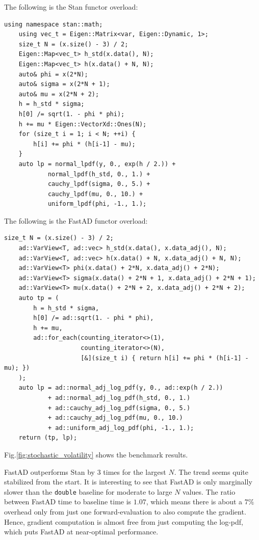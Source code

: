 The following is the Stan functor overload:
\begin{lstlisting}[style=customcpp]
    using namespace stan::math;
    using vec_t = Eigen::Matrix<var, Eigen::Dynamic, 1>;
    size_t N = (x.size() - 3) / 2;
    Eigen::Map<vec_t> h_std(x.data(), N);
    Eigen::Map<vec_t> h(x.data() + N, N);
    auto& phi = x(2*N);
    auto& sigma = x(2*N + 1);
    auto& mu = x(2*N + 2);
    h = h_std * sigma;
    h[0] /= sqrt(1. - phi * phi);
    h += mu * Eigen::VectorXd::Ones(N);
    for (size_t i = 1; i < N; ++i) {
        h[i] += phi * (h[i-1] - mu);
    }
    auto lp = normal_lpdf(y, 0., exp(h / 2.)) +
            normal_lpdf(h_std, 0., 1.) +
            cauchy_lpdf(sigma, 0., 5.) +
            cauchy_lpdf(mu, 0., 10.) +
            uniform_lpdf(phi, -1., 1.);
\end{lstlisting}
The following is the FastAD functor overload:
\begin{lstlisting}[style=customcpp]
    size_t N = (x.size() - 3) / 2;
    ad::VarView<T, ad::vec> h_std(x.data(), x.data_adj(), N);
    ad::VarView<T, ad::vec> h(x.data() + N, x.data_adj() + N, N);
    ad::VarView<T> phi(x.data() + 2*N, x.data_adj() + 2*N);
    ad::VarView<T> sigma(x.data() + 2*N + 1, x.data_adj() + 2*N + 1);
    ad::VarView<T> mu(x.data() + 2*N + 2, x.data_adj() + 2*N + 2);
    auto tp = (
        h = h_std * sigma,
        h[0] /= ad::sqrt(1. - phi * phi),
        h += mu,
        ad::for_each(counting_iterator<>(1),
                     counting_iterator<>(N),
                     [&](size_t i) { return h[i] += phi * (h[i-1] - mu); })
    );
    auto lp = ad::normal_adj_log_pdf(y, 0., ad::exp(h / 2.)) 
            + ad::normal_adj_log_pdf(h_std, 0., 1.)
            + ad::cauchy_adj_log_pdf(sigma, 0., 5.)
            + ad::cauchy_adj_log_pdf(mu, 0., 10.) 
            + ad::uniform_adj_log_pdf(phi, -1., 1.);
    return (tp, lp);
\end{lstlisting}
Fig.\ref{fig:stochastic_volatility} shows the benchmark results.

FastAD outperforms Stan by 3 times for the largest $N$.
The trend seems quite stabilized from the start.
It is interesting to see that FastAD is only marginally slower than the \verb|double| baseline
for moderate to large $N$ values.
The ratio between FastAD time to baseline time is $ 1.07$, which means there is about a $7\%$ overhead only
from just one forward-evaluation to also compute the gradient.
Hence, gradient computation is almost free from just computing the log-pdf,
which puts FastAD at near-optimal performance.
